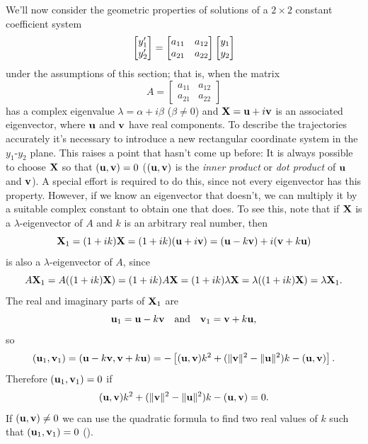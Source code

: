 We'll now  consider the geometric properties of solutions of a
$2\times2$ constant coefficient system
\begin{equation} \label{eq:10.6.10}
\begin{bmatrix}y_1'\\y_2'\end{bmatrix}=\begin{bmatrix}a_{11}&a_{12}\\a_{21}&a_{22}\end{bmatrix}
\begin{bmatrix}y_1\\y_2\end{bmatrix}
\end{equation}
under the assumptions of this section; that is, when the matrix
\[
A=\begin{bmatrix}a_{11}&a_{12}\\a_{21}&a_{22}\end{bmatrix}
\]
has a complex eigenvalue $\lambda=\alpha+i\beta$
($\beta\ne0$) and $\mathbf{X}=\mathbf{u}+i\mathbf{v}$ is an
associated eigenvector, where $\mathbf{u}$ and $\mathbf{v}$ have real
components. To describe the trajectories
accurately it's necessary to
introduce a new rectangular coordinate system in the $y_1$-$y_2$
plane. This raises a point that hasn't come up before: It is always
possible to choose $\mathbf{X}$ so that $(\mathbf{u},\mathbf{v})=0$
($(\mathbf{u},\mathbf{v})$ is the \emph{inner product} or \emph{dot product} of $\mathbf{u}$ and $\mathbf{v}$).
A special
effort is required to do this, since not every eigenvector has this
property. However, if we know an eigenvector that doesn't, we can
multiply it by a suitable complex constant to obtain one that does. To
see this, note that if $\mathbf{X}$ is a $\lambda$-eigenvector of $A$ and
$k$ is an arbitrary real number, then
\[
\mathbf{X}_1=(1+ik)\mathbf{X}=(1+ik)(\mathbf{u}+i\mathbf{v})
=(\mathbf{u}-k\mathbf{v})+i(\mathbf{v}+k\mathbf{u})
\]
is also a $\lambda$-eigenvector of $A$, since
\[
A\mathbf{X}_1= A((1+ik)\mathbf{X})=(1+ik)A\mathbf{X}=(1+ik)\lambda\mathbf{X}=
\lambda((1+ik)\mathbf{X})=\lambda\mathbf{X}_1.
\]
The real and imaginary parts of $\mathbf{X}_1$ are
\begin{equation} \label{eq:10.6.11}
\mathbf{u}_1=\mathbf{u}-k\mathbf{v} \quad\text{and}\quad 
\mathbf{v}_1=\mathbf{v}+k\mathbf{u},
\end{equation}
so
\[
(\mathbf{u}_1,\mathbf{v}_1)=(\mathbf{u}-k\mathbf{v},\mathbf{v}+k\mathbf{u})
=-\left[(\mathbf{u},\mathbf{v})k^2+(\|\mathbf{v}\|^2-\|\mathbf{u}\|^2)k
-(\mathbf{u},\mathbf{v})\right].
\]
Therefore $(\mathbf{u}_1,\mathbf{v}_1)=0$ if
\begin{equation} \label{eq:10.6.12}
(\mathbf{u},\mathbf{v})k^2+(\|\mathbf{v}\|^2-\|\mathbf{u}\|^2)k-(\mathbf{u},\mathbf{v})=0.
\end{equation}
If $(\mathbf{u},\mathbf{v})\ne0$ we can use the quadratic formula to find
two real values of $k$ such that $(\mathbf{u}_1,\mathbf{v}_1)=0$
().

